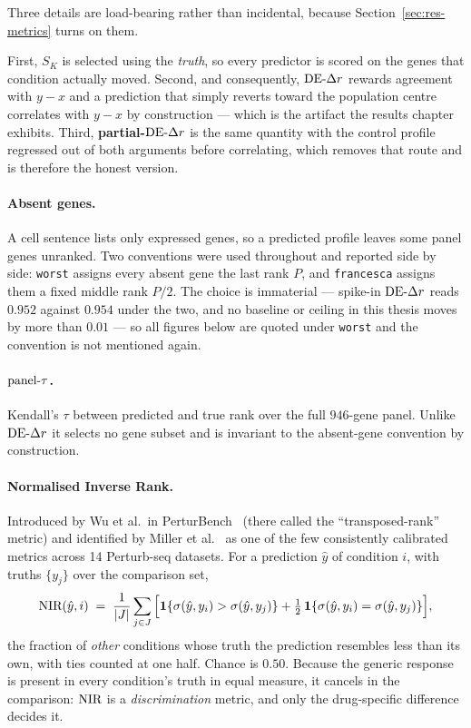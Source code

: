 Three details are load-bearing rather than incidental, because Section~\ref{sec:res-metrics} turns
on them.

First, $S_K$ is selected using the \emph{truth}, so every predictor is scored on the genes that
condition actually moved. Second, and consequently, $\textrm{DE-}\Delta r$ rewards agreement with $y - x$ and a
prediction that simply reverts toward the population centre correlates with $y - x$ by construction
--- which is the artifact the results chapter exhibits. Third, \textbf{partial-}$\textrm{DE-}\Delta r$ is the same
quantity with the control profile regressed out of both arguments before correlating, which removes
that route and is therefore the honest version.

\paragraph{Absent genes.} A cell sentence lists only expressed genes, so a predicted profile leaves
some panel genes unranked. Two conventions were used throughout and reported side by side:
\texttt{worst} assigns every absent gene the last rank $P$, and \texttt{francesca} assigns them a
fixed middle rank $P/2$. The choice is immaterial --- spike-in $\textrm{DE-}\Delta r$ reads $0.952$ against $0.954$
under the two, and no baseline or ceiling in this thesis moves by more than $0.01$ --- so all figures
below are quoted under \texttt{worst} and the convention is not mentioned again.

\paragraph{$\textrm{panel-}\tau$.} Kendall's $\tau$ between predicted and true rank over the full $946$-gene
panel. Unlike $\textrm{DE-}\Delta r$ it selects no gene subset and is invariant to the absent-gene convention by
construction.

\paragraph{Normalised Inverse Rank.} Introduced by Wu et al.\ in
PerturBench~\cite{perturbench} (there called the ``transposed-rank'' metric) and identified by
Miller et al.~\cite{miller} as one of the few consistently calibrated metrics across 14 Perturb-seq
datasets. For a prediction $\hat{y}$ of condition $i$, with truths $\{y_j\}$ over the comparison
set,
\begin{equation}
  \textrm{NIR}(\hat{y}, i) \;=\; \frac{1}{|J|}\sum_{j \in J}
    \Big[\mathbf{1}\{\sigma(\hat{y}, y_i) > \sigma(\hat{y}, y_j)\}
       + \tfrac{1}{2}\,\mathbf{1}\{\sigma(\hat{y}, y_i) = \sigma(\hat{y}, y_j)\}\Big],
\end{equation}
the fraction of \emph{other} conditions whose truth the prediction resembles less than its own,
with ties counted at one half. Chance is $0.50$. Because the generic response is present in every
condition's truth in equal measure, it cancels in the comparison: $\textrm{NIR}$ is a
\emph{discrimination} metric, and only the drug-specific difference decides it.

